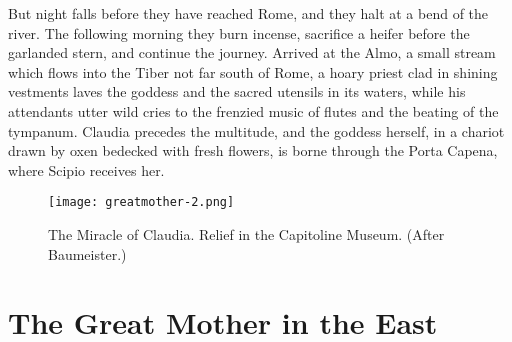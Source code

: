 \documentclass[a4paper, 11pt, oneside, polutonikogreek, english]{article}
\begin{document}
But night falls before they have reached Rome, and they halt at a bend of the river. The following morning they burn incense, sacrifice a heifer before the garlanded stern, and continue the journey. Arrived at the Almo, a small stream which flows into the Tiber not far south of Rome, a hoary priest clad in shining vestments laves the goddess and the sacred utensils in its waters, while his attendants utter wild cries to the frenzied music of flutes and the beating of the tympanum. Claudia precedes the multitude, and the goddess herself, in a chariot drawn by oxen bedecked with fresh flowers, is borne through the Porta Capena, where Scipio receives her.

\begin{figure}[H]
\centering
\texttt{[image: greatmother-2.png]}
\caption{The Miracle of Claudia. Relief in the Capitoline Museum. (After Baumeister.)}
\end{figure}

\clearpage
\section{The Great Mother in the East}
\end{document}
